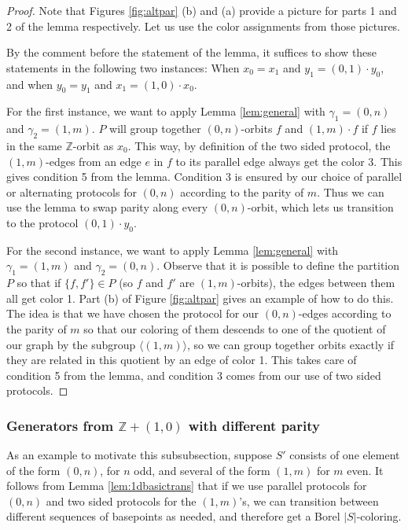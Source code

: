 \documentclass[10pt,a4paper]{article}
\newcommand{\0}{\varnothing}
\newcommand{\Z}{\mathbb{Z}}
\begin{document}
\begin{proof}
Note that Figures \ref{fig:altpar} (b) and (a) provide a picture for parts 1 and 2 of the lemma respectively. Let us use the color assignments from those pictures.

By the comment before the statement of the lemma, it suffices to show these statements in the following two instances: When $x_0 = x_1$ and $y_1 = (0,1) \cdot y_0$, and when $y_0 = y_1$ and $x_1 = (1,0) \cdot x_0$.

For the first instance, we want to apply Lemma \ref{lem:general} with $\gamma_1 = (0,n)$ and $\gamma_2 = (1,m)$. $P$ will group together $(0,n)$-orbits $f$ and $(1,m) \cdot f$ if $f$ lies in the same $\Z$-orbit as $x_0$. This way, by definition of the two sided protocol, the $(1,m)$-edges from an edge $e$ in $f$ to its parallel edge always get the color 3. This gives condition 5 from the lemma. Condition 3 is ensured by our choice of parallel or alternating protocols for $(0,n)$ according to the parity of $m$. Thus we can use the lemma to swap parity along every $(0,n)$-orbit, which lets us transition to the protocol $(0,1) \cdot y_0$.

For the second instance, we want to apply Lemma \ref{lem:general} with $\gamma_1 = (1,m)$ and $\gamma_2 = (0,n)$. Observe that it is possible to define the partition $P$ so that if $\{f,f'\} \in P$ (so $f$ and $f'$ are $(1,m)$-orbits), the edges between them all get color 1. Part (b) of Figure \ref{fig:altpar} gives an example of how to do this. The idea is that we have chosen the protocol for our $(0,n)$-edges according to the parity of $m$ so that our coloring of them descends to one of the quotient of our graph by the subgroup $\langle (1,m) \rangle$, so we can group together orbits exactly if they are related in this quotient by an edge of color 1. This takes care of condition 5 from the lemma, and condition 3 comes from our use of two sided protocols.
\end{proof}

\subsubsection{Generators from $\Z + (1,0)$ with different parity}

As an example to motivate this subsubsection, suppose $S'$ consists of one element of the form $(0,n)$, for $n$ odd, and several of the form $(1,m)$ for $m$ even. It follows from Lemma \ref{lem:1dbasictrans} that if we use parallel protocols for $(0,n)$ and two sided protocols for the $(1,m)$'s, we can transition between different sequences of basepoints as needed, and therefore get a Borel $|S|$-coloring. 
\end{document}
